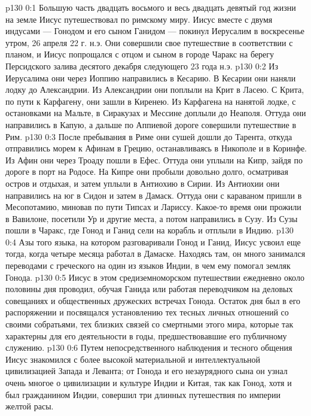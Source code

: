 \author{Комиссия срединников}
\vs p130 0:1 Большую часть двадцать восьмого и весь двадцать девятый год жизни на земле Иисус путешествовал по римскому миру. Иисус вместе с двумя индусами --- Гонодом и его сыном Ганидом --- покинул Иерусалим в воскресенье утром, 26 апреля 22 г. н.э. Они совершили свое путешествие в соответствии с планом, и Иисус попрощался с отцом и сыном в городе Чаракс на берегу Персидского залива десятого декабря следующего 23 года н.э.
\vs p130 0:2 \pc Из Иерусалима они через Иоппию направились в Кесарию. В Кесарии они наняли лодку до Александрии. Из Александрии они поплыли на Крит в Ласею. С Крита, по пути к Карфагену, они зашли в Киренею. Из Карфагена на нанятой лодке, с остановками на Мальте, в Сиракузах и Мессине доплыли до Неаполя. Оттуда они направились в Капую, а дальше по Аппиевой дороге совершили путешествие в Рим.
\vs p130 0:3 После пребывания в Риме они сушей дошли до Тарента, откуда отправились морем к Афинам в Грецию, останавливаясь в Никополе и в Коринфе. Из Афин они через Троаду пошли в Ефес. Оттуда они уплыли на Кипр, зайдя по дороге в порт на Родосе. На Кипре они пробыли довольно долго, осматривая остров и отдыхая, и затем уплыли в Антиохию в Сирии. Из Антиохии они направились на юг в Сидон и затем в Дамаск. Оттуда они с караваном пришли в Месопотамию, миновав по пути Типсах и Лариссу. Какое\hyp{}то время они прожили в Вавилоне, посетили Ур и другие места, а потом направились в Сузу. Из Сузы пошли в Чаракс, где Гонод и Ганид сели на корабль и отплыли в Индию.
\vs p130 0:4 \pc Азы того языка, на котором разговаривали Гонод и Ганид, Иисус усвоил еще тогда, когда четыре месяца работал в Дамаске. Находясь там, он много занимался переводами с греческого на один из языков Индии, в чем ему помогал земляк Гонода.
\vs p130 0:5 \pc Иисус в этом средиземноморском путешествии ежедневно около половины дня проводил, обучая Ганида или работая переводчиком на деловых совещаниях и общественных дружеских встречах Гонода. Остаток дня был в его распоряжении и посвящался установлению тех тесных личных отношений со своими собратьями, тех близких связей со смертными этого мира, которые так характерны для его деятельности в годы, предшествовавшие его публичному служению.
\vs p130 0:6 Путем непосредственного наблюдения и тесного общения Иисус знакомился с более высокой материальной и интеллектуальной цивилизацией Запада и Леванта; от Гонода и его незаурядного сына он узнал очень многое о цивилизации и культуре Индии и Китая, так как Гонод, хотя и был гражданином Индии, совершил три длинных путешествия по империи желтой расы.
